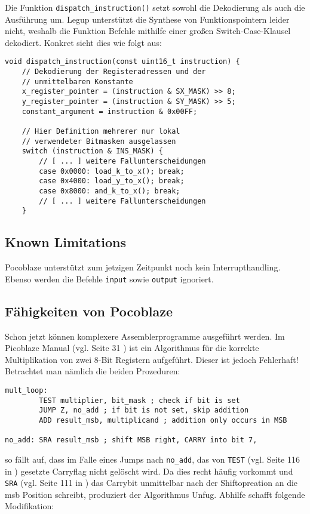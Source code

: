 \documentclass[oneside,a4paper]{article}
\def\A#1{\lstinline[style=asm]{#1}}
\def\C#1{\lstinline[style=c]{#1}}
\begin{document}
Die Funktion \C{dispatch_instruction()} setzt sowohl die Dekodierung
als auch die Ausführung um.
Legup unterstützt die Synthese von Funktionspointern leider nicht,
weshalb die Funktion Befehle mithilfe einer großen Switch-Case-Klausel
dekodiert. Konkret sieht dies wie folgt aus:

\begin{lstlisting}[style=c,caption={Instruction decoder},label=decoder]
void dispatch_instruction(const uint16_t instruction) {
    // Dekodierung der Registeradressen und der
    // unmittelbaren Konstante
    x_register_pointer = (instruction & SX_MASK) >> 8;
    y_register_pointer = (instruction & SY_MASK) >> 5;
    constant_argument = instruction & 0x00FF;

    // Hier Definition mehrerer nur lokal
    // verwendeter Bitmasken ausgelassen
    switch (instruction & INS_MASK) {
        // [ ... ] weitere Fallunterscheidungen
        case 0x0000: load_k_to_x(); break;
        case 0x4000: load_y_to_x(); break;
        case 0x8000: and_k_to_x(); break;
        // [ ... ] weitere Fallunterscheidungen
    }
\end{lstlisting}

\subsection{Known Limitations}
Pocoblaze unterstützt zum jetzigen Zeitpunkt noch kein Interrupthandling.
Ebenso werden die Befehle \A{input} sowie \A{output} ignoriert.

\subsection{Fähigkeiten von Pocoblaze}
Schon jetzt können komplexere Assemblerprogramme ausgeführt werden.
Im Picoblaze Manual (vgl. Seite 31 \cite{PICO2004}) ist
ein Algorithmus für die korrekte Multiplikation von zwei 8-Bit Registern
aufgeführt. Dieser ist jedoch Fehlerhaft!
Betrachtet man nämlich die beiden Prozeduren:
\begin{lstlisting}[style=asm]
mult_loop:
        TEST multiplier, bit_mask ; check if bit is set
        JUMP Z, no_add ; if bit is not set, skip addition
        ADD result_msb, multiplicand ; addition only occurs in MSB

no_add: SRA result_msb ; shift MSB right, CARRY into bit 7,
\end{lstlisting}
so fällt auf, dass im Falle eines Jumps nach \A{no_add}, das
von \A{TEST} (vgl. Seite 116 in \cite{PICO2004})
gesetzte Carryflag nicht gelöscht wird. Da dies recht
häufig vorkommt und \A{SRA} (vgl. Seite 111 in \cite{PICO2004})
das Carrybit unmittelbar nach der
Shiftopreation an die msb Position schreibt, produziert der
Algorithmus Unfug. Abhilfe schafft folgende Modifikation:
\end{document}
